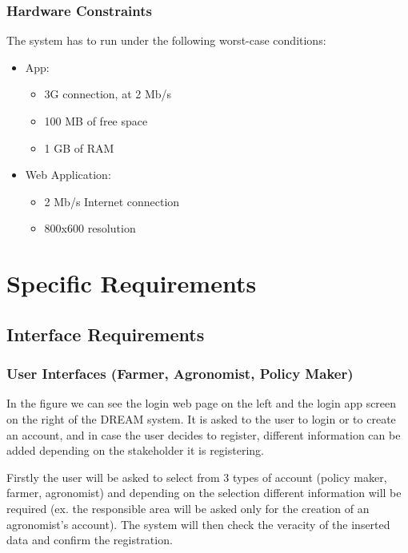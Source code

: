 \documentclass{article}
\begin{document}
\subsubsection{Hardware Constraints}
The system has to run under the following worst-case conditions:

    \begin{itemize}
        \item App:
            \begin{itemize}
                \item 3G connection, at 2 Mb/s
                \item 100 MB of free space
                \item 1 GB of RAM
            \end{itemize}
        \item Web Application:
            \begin{itemize}
                \item 2 Mb/s Internet connection
                \item 800x600 resolution
            \end{itemize}
    \end{itemize}


\newpage










\section{Specific Requirements}

\subsection{Interface Requirements}

\subsubsection{User Interfaces (Farmer, Agronomist, Policy Maker)}
    
    In the figure we can see the login web page on the left and the login app screen on the right of the DREAM system. It is asked to the user to login or to create an account, and in case the user decides to register, different information can be added depending on the stakeholder it is registering. \par Firstly the user will be asked to select from 3 types of account (policy maker, farmer, agronomist) and depending on the selection different information will be required (ex. the responsible area will be asked only for the creation of an agronomist’s account). The system will then check the veracity of the inserted data and confirm the registration.
    
\end{document}
